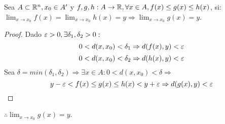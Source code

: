 \begin{theorem}
  Sea $A \subset \mathbb{R}^n, x_0 \in A^{\prime}$ y $f, g, h: A \to \mathbb{R}, \forall x \in A, f(x) \leq g(x) \leq h(x)$, si: \\
  $\lim_{x \to x_0} f(x) = \lim_{x \to x_0} h(x) = y \Rightarrow \lim_{x \to x_0} g(x) = y$.
  \begin{proof}
    Dado $\varepsilon > 0, \exists \delta_1, \delta_2 > 0 :$ \begin{equation}
      0 < d(x, x_0) < \delta_1 \Rightarrow d(f(x), y) < \varepsilon
    \end{equation}
    \begin{equation}
      0 < d(x, x_0) < \delta_2 \Rightarrow d(h(x), y) < \varepsilon
    \end{equation} Sea $\delta = min(\delta_1, \delta_2) \Rightarrow \exists x \in A : 0 < d(x, x_0) < \delta \Rightarrow$
    \begin{equation}
      y - \varepsilon < f(x) \leq g(x) \leq h(x) < y + \varepsilon \Rightarrow d(g(x), y) < \varepsilon
    \end{equation}
  \end{proof}
  $\therefore \lim_{x \to x_0} g(x) = y$.
\end{theorem}
